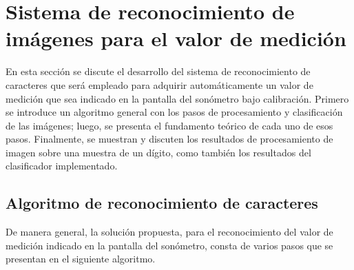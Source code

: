 
\chapter{Sistema de reconocimiento de imágenes para el valor de medición}
\label{ch:image_recognition}
En esta sección se discute el desarrollo del sistema de reconocimiento de caracteres que será empleado para adquirir automáticamente un valor de medición que sea indicado en la pantalla del sonómetro bajo calibración.
Primero se introduce un algoritmo general con los pasos de procesamiento y clasificación de las imágenes;
luego, se presenta el fundamento teórico de cada uno de esos pasos.
Finalmente, se muestran y discuten los resultados de procesamiento de imagen sobre una muestra de un dígito, como también los resultados del clasificador implementado.

\section*{Algoritmo de reconocimiento de caracteres}
De manera general, la solución propuesta, para el reconocimiento del valor de medición indicado en la pantalla del sonómetro, consta de varios pasos que se presentan en el siguiente algoritmo.

